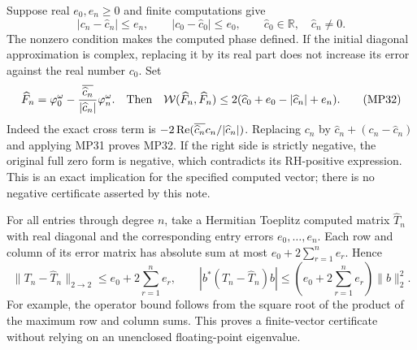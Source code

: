 Suppose real $e_0,e_n\geq0$ and finite computations give
\begin{equation}
 |c_n-\widehat c_n|\leq e_n,\qquad
 |c_0-\widehat c_0|\leq e_0,\qquad
 \widehat c_0\in\mathbb R,\quad \widehat c_n\ne0.
 \tag{MP31}
\end{equation}
The nonzero condition makes the computed phase defined. If the initial
diagonal approximation is complex, replacing it by its real part does
not increase its error against the real number $c_0$.
Set
\begin{equation}
 \widehat F_n=\varphi_0^\omega-
                 \frac{\overline{\widehat c_n}}{|\widehat c_n|}
                      \varphi_n^\omega.
 \quad\text{Then}\quad
 \mathcal W(\widehat F_n,\widehat F_n)
 \leq2(\widehat c_0+e_0-|\widehat c_n|+e_n).
 \tag{MP32}
\end{equation}
Indeed the exact cross term is
$-2\operatorname{Re}(\overline{\widehat c_n}c_n/|\widehat c_n|)$.
Replacing $c_n$ by $\widehat c_n+(c_n-\widehat c_n)$ and applying
MP31 proves MP32. If the right side is strictly negative, the original
full zero form is negative, which contradicts its RH-positive expression.
This is an exact implication for the specified computed vector; there
is no negative certificate asserted by this note.

For all entries through degree $n$, take a Hermitian Toeplitz computed
matrix $\widehat T_n$ with real diagonal and the corresponding entry
errors $e_0,\ldots,e_n$. Each row and column of its error matrix has
absolute sum at most $e_0+2\sum_{r=1}^n e_r$. Hence
\begin{equation}
 \|T_n-\widehat T_n\|_{2\to2}
       \leq e_0+2\sum_{r=1}^n e_r,\qquad
 |b^*(T_n-\widehat T_n)b|
       \leq\left(e_0+2\sum_{r=1}^n e_r\right)\|b\|_2^2.
 \tag{MP33}
\end{equation}
For example, the operator bound follows from the square root of the
product of the maximum row and column sums. This proves a finite-vector
certificate without relying on an unenclosed floating-point eigenvalue.

